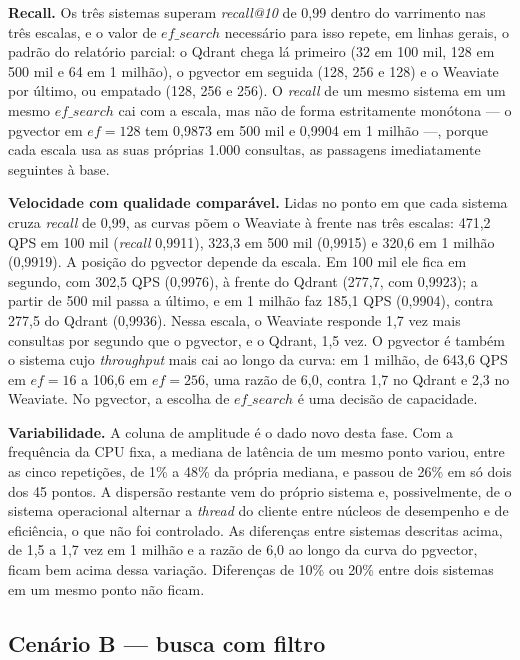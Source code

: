 \textbf{Recall.} Os três sistemas superam \textit{recall@10} de 0,99 dentro do varrimento nas três escalas, e o valor de $ef\_search$ necessário para isso repete, em linhas gerais, o padrão do relatório parcial: o Qdrant chega lá primeiro (32 em 100 mil, 128 em 500 mil e 64 em 1 milhão), o pgvector em seguida (128, 256 e 128) e o Weaviate por último, ou empatado (128, 256 e 256). O \textit{recall} de um mesmo sistema em um mesmo $ef\_search$ cai com a escala, mas não de forma estritamente monótona --- o pgvector em $ef = 128$ tem 0,9873 em 500 mil e 0,9904 em 1 milhão ---, porque cada escala usa as suas próprias 1.000 consultas, as passagens imediatamente seguintes à base.

\textbf{Velocidade com qualidade comparável.} Lidas no ponto em que cada sistema cruza \textit{recall} de 0,99, as curvas põem o Weaviate à frente nas três escalas: 471,2 QPS em 100 mil (\textit{recall} 0,9911), 323,3 em 500 mil (0,9915) e 320,6 em 1 milhão (0,9919). A posição do pgvector depende da escala. Em 100 mil ele fica em segundo, com 302,5 QPS (0,9976), à frente do Qdrant (277,7, com 0,9923); a partir de 500 mil passa a último, e em 1 milhão faz 185,1 QPS (0,9904), contra 277,5 do Qdrant (0,9936). Nessa escala, o Weaviate responde 1,7 vez mais consultas por segundo que o pgvector, e o Qdrant, 1,5 vez. O pgvector é também o sistema cujo \textit{throughput} mais cai ao longo da curva: em 1 milhão, de 643,6 QPS em $ef = 16$ a 106,6 em $ef = 256$, uma razão de 6,0, contra 1,7 no Qdrant e 2,3 no Weaviate. No pgvector, a escolha de $ef\_search$ é uma decisão de capacidade.

\textbf{Variabilidade.} A coluna de amplitude é o dado novo desta fase. Com a frequência da CPU fixa, a mediana de latência de um mesmo ponto variou, entre as cinco repetições, de 1\% a 48\% da própria mediana, e passou de 26\% em só dois dos 45 pontos. A dispersão restante vem do próprio sistema e, possivelmente, de o sistema operacional alternar a \textit{thread} do cliente entre núcleos de desempenho e de eficiência, o que não foi controlado. As diferenças entre sistemas descritas acima, de 1,5 a 1,7 vez em 1 milhão e a razão de 6,0 ao longo da curva do pgvector, ficam bem acima dessa variação. Diferenças de 10\% ou 20\% entre dois sistemas em um mesmo ponto não ficam.

\subsection{Cenário B --- busca com filtro}

